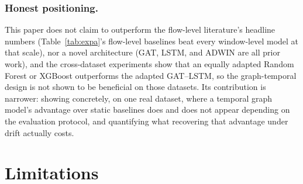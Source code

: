 \documentclass[twocolumn]{llncs}
\begin{document}
\subsubsection{Honest positioning.} This paper does not claim to outperform the flow-level literature's
headline numbers (Table~\ref{tab:expa}'s flow-level baselines beat every window-level model at that
scale), nor a novel architecture (GAT, LSTM, and ADWIN are all prior work), and the cross-dataset experiments show that an equally adapted Random Forest or XGBoost outperforms the adapted GAT--LSTM, so the graph-temporal design is not shown to be beneficial on those datasets. Its contribution is
narrower: showing concretely, on one real dataset, where a temporal graph model's advantage over
static baselines does and does not appear depending on the evaluation protocol, and quantifying
what recovering that advantage under drift actually costs.

\section{Limitations}
\label{sec:limitations}
\end{document}
